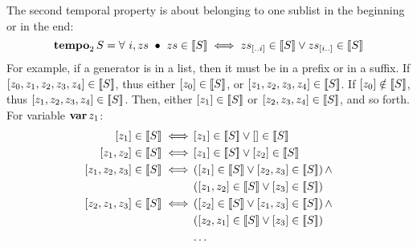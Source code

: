 The second temporal property is about belonging to one sublist in the beginning or in the end:
%
\begin{equation}
\tempo[2]{S} = \forall~ i, zs ~\bullet~
zs \in \denote{S} \iff
\sliceright{zs}{i} \in \denote{S} \lor \sliceleft{zs}{i} \in \denote{S}\label{def:tempo2}
\end{equation}
%
For example, if a generator is in a list, then it must be in a prefix or in a suffix.
If $\listsin{z_0,z_1,z_2,z_3,z_4} \in \denote{S}$, thus either $\listsin{z_0}\in\denote{S}$, or $\listsin{z_1,z_2,z_3,z_4} \in \denote{S}$.
If $\listsin{z_0} \notin \denote{S}$, thus $\listsin{z_1,z_2,z_3,z_4} \in \denote{S}$.
Then, either $\listsin{z_1} \in \denote{S}$ or $\listsin{z_2,z_3,z_4} \in \denote{S}$, and so forth.
For variable $\var{z_1}$:
%
\begin{align}
\listsin{z_1} \in \denote{S} \iff &
  \listsin{z_1} \in \denote{S} \lor \listsin{} \in \denote{S}\nonumber\\
\listsin{z_1,z_2} \in \denote{S} \iff &
  \listsin{z_1} \in \denote{S} \lor \listsin{z_2} \in \denote{S}\nonumber\\
\listsin{z_1,z_2,z_3} \in \denote{S} \iff &
  \left(\listsin{z_1} \in \denote{S} \lor \listsin{z_2,z_3} \in \denote{S}\right) \land\nonumber\\
  &\left(\listsin{z_1,z_2} \in \denote{S} \lor \listsin{z_3} \in \denote{S}\right)
  \nonumber\\
\listsin{z_2,z_1,z_3} \in \denote{S} \iff &
  \left(\listsin{z_2} \in \denote{S} \lor \listsin{z_1,z_3} \in \denote{S}\right) \land\nonumber\\
  &\left(\listsin{z_2,z_1} \in \denote{S} \lor \listsin{z_3} \in \denote{S}\right)
  \nonumber\\
& \ldots\nonumber
\end{align}

%
%

